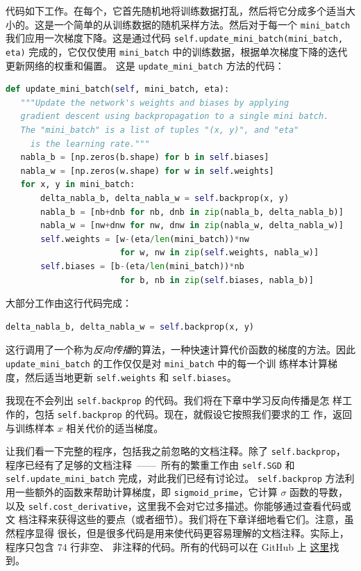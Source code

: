 代码如下工作。在每个\epoch{}，它首先随机地将训练数据打乱，然后将它分成多个适当大
小的\minibatch{}。这是一个简单的从训练数据的随机采样方法。然后对于每一个
\lstinline!mini_batch! 我们应用一次梯度下降。这是通过代码
\lstinline!self.update_mini_batch(mini_batch, eta)! 完成的，它仅仅使用
\lstinline!mini_batch! 中的训练数据，根据单次梯度下降的迭代更新网络的权重和偏置。
这是 \lstinline!update_mini_batch! 方法的代码：
\begin{lstlisting}[language=Python]
def update_mini_batch(self, mini_batch, eta):
   """Update the network's weights and biases by applying
   gradient descent using backpropagation to a single mini batch.
   The "mini_batch" is a list of tuples "(x, y)", and "eta"
     is the learning rate."""
   nabla_b = [np.zeros(b.shape) for b in self.biases]
   nabla_w = [np.zeros(w.shape) for w in self.weights]
   for x, y in mini_batch:
       delta_nabla_b, delta_nabla_w = self.backprop(x, y)
       nabla_b = [nb+dnb for nb, dnb in zip(nabla_b, delta_nabla_b)]
       nabla_w = [nw+dnw for nw, dnw in zip(nabla_w, delta_nabla_w)]
       self.weights = [w-(eta/len(mini_batch))*nw
                       for w, nw in zip(self.weights, nabla_w)]
       self.biases = [b-(eta/len(mini_batch))*nb
                       for b, nb in zip(self.biases, nabla_b)]
\end{lstlisting}

大部分工作由这行代码完成：
\begin{lstlisting}[language=Python]
     delta_nabla_b, delta_nabla_w = self.backprop(x, y)
\end{lstlisting}

这行调用了一个称为\emph{反向传播}的算法，一种快速计算代价函数的梯度的方法。因此
\lstinline!update_mini_batch! 的工作仅仅是对 \lstinline!mini_batch! 中的每一个训
练样本计算梯度，然后适当地更新 \lstinline!self.weights! 和
\lstinline!self.biases!。

我现在不会列出 \lstinline!self.backprop! 的代码。我们将在下章中学习反向传播是怎
样工作的，包括 \lstinline!self.backprop! 的代码。现在，就假设它按照我们要求的工
作，返回与训练样本 $x$ 相关代价的适当梯度。

让我们看一下完整的程序，包括我之前忽略的文档注释。除了 \lstinline!self.backprop!，
程序已经有了足够的文档注释~——~所有的繁重工作由 \lstinline!self.SGD! 和
\lstinline!self.update_mini_batch! 完成，对此我们已经有讨论过。
\lstinline!self.backprop! 方法利用一些额外的函数来帮助计算梯度，即
\lstinline!sigmoid_prime!，它计算 $\sigma$ 函数的导数，以及
\lstinline!self.cost_derivative!，这里我不会对它过多描述。你能够通过查看代码或文
档注释来获得这些的要点（或者细节）。我们将在下章详细地看它们。注意，虽然程序显得
很长，但是很多代码是用来使代码更容易理解的文档注释。实际上，程序只包含 74 行非空、
非注释的代码。所有的代码可以在 GitHub 上%
\href{https://github.com/mnielsen/neural-networks-and-deep-learning/blob/master/src/network.py}{
  这里}找到。

